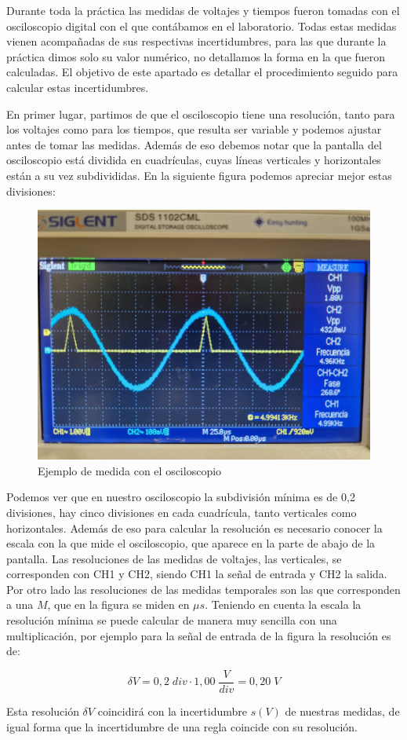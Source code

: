 \documentclass[a4paper,12pt,titlepage]{article}
\begin{document}
Durante toda la práctica las medidas de voltajes y tiempos fueron tomadas con el osciloscopio digital con el que contábamos en el laboratorio. Todas estas medidas vienen acompañadas de sus respectivas incertidumbres, para las que durante la práctica dimos solo su valor numérico, no detallamos la forma en la que fueron calculadas. El objetivo de este apartado es detallar el procedimiento seguido para calcular estas incertidumbres.

En primer lugar, partimos de que el osciloscopio tiene una resolución, tanto para los voltajes como para los tiempos, que resulta ser variable y podemos ajustar antes de tomar las medidas. Además de eso debemos notar que la pantalla del osciloscopio está dividida en cuadrículas, cuyas líneas verticales y horizontales están a su vez subdivididas. En la siguiente figura podemos apreciar mejor estas divisiones:

\begin{figure}[h!]
    \centering
    \includegraphics[width= 0.65\linewidth]{fourier/delta_dirac/delta1.jpg}
    \caption{Ejemplo de medida con el osciloscopio}
    \label{fig:enter-label}
\end{figure}

Podemos ver que en nuestro osciloscopio la subdivisión mínima es de 0,2 divisiones, hay cinco divisiones en cada cuadrícula, tanto verticales como horizontales. Además de eso para calcular la resolución es necesario conocer la escala con la que mide el osciloscopio, que aparece en la parte de abajo de la pantalla. Las resoluciones de las medidas de voltajes, las verticales, se corresponden con CH1 y CH2, siendo CH1 la señal de entrada y CH2 la salida. Por otro lado las resoluciones de las medidas temporales son las que corresponden a una $M$, que en la figura se miden en $\mu s$. Teniendo en cuenta la escala la resolución mínima se puede calcular de manera muy sencilla con una multiplicación, por ejemplo para la señal de entrada de la figura la resolución es de:

\begin{equation}
    \delta V = 0,2\;div \cdot 1,00 \;\frac{V}{div} = 0,20 \;V
\end{equation}

Esta resolución $\delta V$ coincidirá con la incertidumbre $s(V)$ de nuestras medidas, de igual forma que la incertidumbre de una regla coincide con su resolución.
\end{document}
